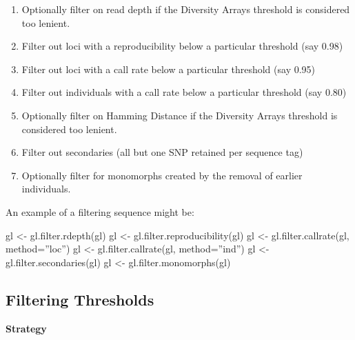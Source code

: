 \documentclass[
  letterpaper,
  DIV=11,
  numbers=noendperiod]{scrreprt}
\newenvironment{Shaded}{\begin{snugshade}}{\end{snugshade}}
\newcommand{\AttributeTok}[1]{\textcolor[rgb]{0.49,0.56,0.16}{#1}}
\newcommand{\FunctionTok}[1]{\textcolor[rgb]{0.02,0.16,0.49}{#1}}
\newcommand{\NormalTok}[1]{\textcolor[rgb]{0.00,0.44,0.13}{#1}}
\newcommand{\OtherTok}[1]{\textcolor[rgb]{0.00,0.44,0.13}{#1}}
\providecommand{\tightlist}{%
  \setlength{\itemsep}{0pt}\setlength{\parskip}{0pt}}\usepackage{longtable,booktabs,array}
\begin{document}
\begin{enumerate}
\def\labelenumi{\arabic{enumi}.}
\tightlist
\item
  Optionally filter on read depth if the Diversity Arrays threshold is
  considered too lenient.
\item
  Filter out loci with a reproducibility below a particular threshold
  (say 0.98)
\item
  Filter out loci with a call rate below a particular threshold (say
  0.95)
\item
  Filter out individuals with a call rate below a particular threshold
  (say 0.80)
\item
  Optionally filter on Hamming Distance if the Diversity Arrays
  threshold is considered too lenient.
\item
  Filter out secondaries (all but one SNP retained per sequence tag)
\item
  Optionally filter for monomorphs created by the removal of earlier
  individuals.
\end{enumerate}

An example of a filtering sequence might be:

\begin{Shaded}
\begin{Highlighting}[]
\NormalTok{gl }\OtherTok{\textless{}{-}} \FunctionTok{gl.filter.rdepth}\NormalTok{(gl)}
\NormalTok{gl }\OtherTok{\textless{}{-}} \FunctionTok{gl.filter.reproducibility}\NormalTok{(gl)}
\NormalTok{gl }\OtherTok{\textless{}{-}} \FunctionTok{gl.filter.callrate}\NormalTok{(gl, }\AttributeTok{method=}\NormalTok{”loc”)}
\NormalTok{gl }\OtherTok{\textless{}{-}} \FunctionTok{gl.filter.callrate}\NormalTok{(gl, }\AttributeTok{method=}\NormalTok{”ind”)}
\NormalTok{gl }\OtherTok{\textless{}{-}} \FunctionTok{gl.filter.secondaries}\NormalTok{(gl)}
\NormalTok{gl }\OtherTok{\textless{}{-}} \FunctionTok{gl.filter.monomorphs}\NormalTok{(gl)}
\end{Highlighting}
\end{Shaded}

\hypertarget{filtering-thresholds}{%
\subsection{Filtering Thresholds}\label{filtering-thresholds}}

\textbf{Strategy}
\end{document}
